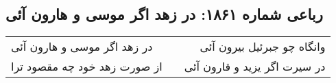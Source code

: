 \begin{center}
\section*{رباعی شماره ۱۸۶۱: در زهد اگر موسی و هارون آئی}
\label{sec:1861}
\begin{longtable}{l p{0.5cm} r}
در زهد اگر موسی و هارون آئی
&&
وانگاه چو جبرئیل بیرون آئی
\\
از صورت زهد خود چه مقصود ترا
&&
در سیرت اگر یزید و قارون آئی
\\
\end{longtable}
\end{center}
